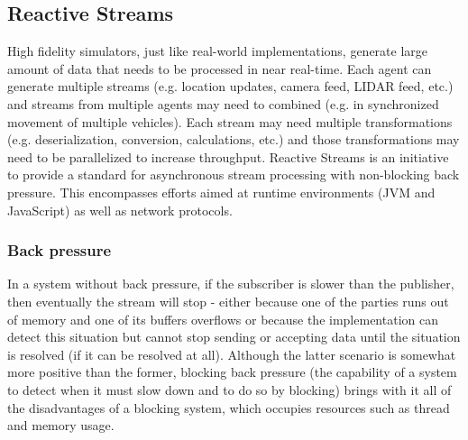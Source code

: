 \documentclass{article}
\let\cite\citep
\begin{document}


\subsection{Reactive Streams}


High fidelity simulators, just like real-world implementations, generate large amount of data that needs to be processed in near real-time. Each agent can generate multiple streams (e.g. location updates, camera feed, LIDAR feed, etc.) and streams from multiple agents may need to combined (e.g. in synchronized movement of multiple vehicles). Each stream may need multiple transformations (e.g. deserialization, conversion, calculations, etc.) and those transformations may need to be parallelized to increase throughput.
Reactive Streams is an initiative to provide a standard for asynchronous stream processing with non-blocking back pressure. This encompasses efforts aimed at runtime environments (JVM and JavaScript) as well as network protocols. \cite{reactive-manifesto} 

\subsubsection{Back pressure}
In a system without back pressure, if the subscriber is slower than the publisher, then eventually the stream will stop - either because one of the parties runs out of memory and one of its buffers overflows or because the implementation can detect this situation but cannot  stop sending or accepting data until the situation is resolved (if it can be resolved at all). Although the latter scenario is somewhat more positive than the former, blocking back pressure (the capability of a system to detect when it must slow down and to do so by blocking) brings with it all of the disadvantages of a blocking system, which occupies resources such as thread and memory usage. \cite{reactive-web-apps}
\end{document}
